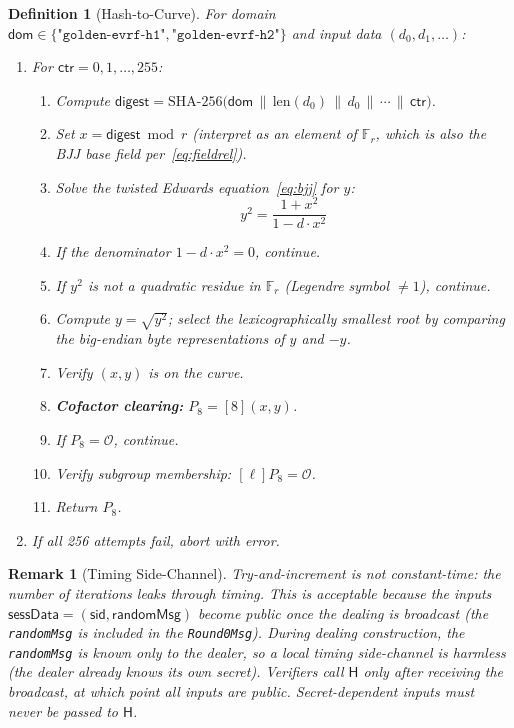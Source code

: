 \documentclass[11pt,a4paper]{article}
\newtheorem{definition}{Definition}[section]
\newtheorem{remark}{Remark}[section]
\newcommand{\F}{\mathbb{F}}
\newcommand{\Fr}{\F_r}
\newcommand{\sid}{\mathsf{sid}}
\newcommand{\hashcurve}{\mathsf{H}}
\begin{document}
\begin{definition}[Hash-to-Curve]
  \label{def:hashtocurve}
  For domain $\mathsf{dom} \in \{\texttt{"golden-evrf-h1"}, \texttt{"golden-evrf-h2"}\}$
  and input data $(d_0, d_1, \ldots)$:
  \begin{enumerate}[nosep]
    \item For $\mathsf{ctr} = 0, 1, \ldots, 255$:
    \begin{enumerate}[nosep]
      \item Compute
        $\mathsf{digest} = \mathrm{SHA\text{-}256}\bigl(\mathsf{dom} \,\|\, \mathrm{len}(d_0) \,\|\, d_0 \,\|\, \cdots \,\|\, \mathsf{ctr}\bigr)$.
      \item Set $x = \mathsf{digest} \bmod r$ (interpret as an element of $\Fr$,
            which is also the BJJ base field per~\eqref{eq:fieldrel}).
      \item Solve the twisted Edwards equation~\eqref{eq:bjj} for $y$:
        \begin{equation}
          y^2 = \frac{1 + x^2}{1 - d \cdot x^2}
          \label{eq:ysquared}
        \end{equation}
      \item If the denominator $1 - d \cdot x^2 = 0$, continue.
      \item If $y^2$ is not a quadratic residue in $\Fr$ (Legendre symbol $\ne 1$),
            continue.
      \item Compute $y = \sqrt{y^2}$; select the \emph{lexicographically smallest}
            root by comparing the big-endian byte representations of $y$ and $-y$.
      \item Verify $(x, y)$ is on the curve.
      \item \textbf{Cofactor clearing:} $P_8 = [8](x, y)$.
      \item If $P_8 = \mathcal{O}$, continue.
      \item Verify subgroup membership: $[\ell]P_8 = \mathcal{O}$.
      \item Return $P_8$.
    \end{enumerate}
    \item If all 256 attempts fail, abort with error.
  \end{enumerate}
\end{definition}

\begin{remark}[Timing Side-Channel]
  Try-and-increment is \emph{not} constant-time: the number of iterations leaks
  through timing. This is acceptable because the inputs
  $\mathsf{sessData} = (\sid, \mathsf{randomMsg})$ become public once the
  dealing is broadcast (the \texttt{randomMsg} is included in the
  \texttt{Round0Msg}). During dealing \emph{construction}, the
  \texttt{randomMsg} is known only to the dealer, so a local
  timing side-channel is harmless (the dealer already knows its own secret).
  Verifiers call $\hashcurve$ only after receiving the broadcast, at which
  point all inputs are public. Secret-dependent inputs must never be passed
  to $\hashcurve$.
\end{remark}
\end{document}
